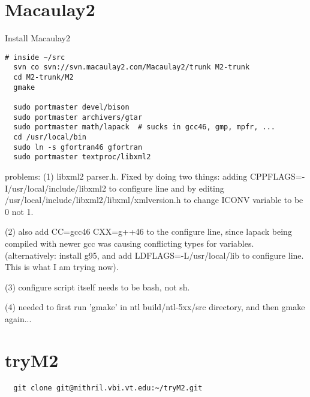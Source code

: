 \documentclass[a4paper]{article}
\begin{document}
\section{Macaulay2}
Install Macaulay2

\begin{verbatim}
# inside ~/src
  svn co svn://svn.macaulay2.com/Macaulay2/trunk M2-trunk
  cd M2-trunk/M2
  gmake

  sudo portmaster devel/bison
  sudo portmaster archivers/gtar
  sudo portmaster math/lapack  # sucks in gcc46, gmp, mpfr, ...
  cd /usr/local/bin
  sudo ln -s gfortran46 gfortran
  sudo portmaster textproc/libxml2

\end{verbatim}

problems: (1) libxml2 parser.h.  Fixed by doing two things: adding
CPPFLAGS=-I/usr/local/include/libxml2 to configure line
and by editing /usr/local/include/libxml2/libxml/xmlversion.h to change ICONV
variable to be 0 not 1.

(2) also add CC=gcc46 CXX=g++46 to the configure line, since lapack being
compiled with newer gcc was causing conflicting types for variables.
(alternatively: install g95, and add LDFLAGS=-L/usr/local/lib to configure
line.  This is what I am trying now).

(3) configure script itself needs to be bash, not sh.

(4) needed to first run 'gmake' in ntl build/ntl-5xx/src directory, and then
gmake again...

\section{tryM2}
\begin{verbatim}
  git clone git@mithril.vbi.vt.edu:~/tryM2.git
\end{verbatim}
\end{document}
